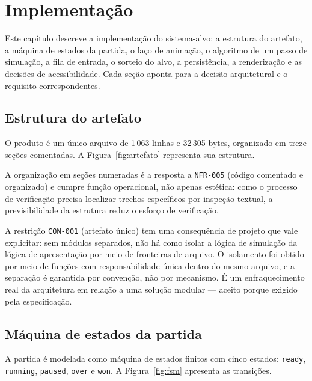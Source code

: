 
\chapter{Implementação}
\label{cap:implementacao}

Este capítulo descreve a implementação do sistema-alvo: a estrutura do artefato,
a máquina de estados da partida, o laço de animação, o algoritmo de um passo de
simulação, a fila de entrada, o sorteio do alvo, a persistência, a renderização e
as decisões de acessibilidade. Cada seção aponta para a decisão arquitetural e o
requisito correspondentes.

\section{Estrutura do artefato}
\label{sec:impl-estrutura}

O produto é um único arquivo de 1\,063 linhas e 32\,305 bytes, organizado em
treze seções comentadas. A Figura~\ref{fig:artefato} representa sua estrutura.



A organização em seções numeradas é a resposta a \texttt{NFR-005} (código
comentado e organizado) e cumpre função operacional, não apenas estética: como o
processo de verificação precisa localizar trechos específicos por inspeção
textual, a previsibilidade da estrutura reduz o esforço de verificação.

A restrição \texttt{CON-001} (artefato único) tem uma consequência de projeto que
vale explicitar: sem módulos separados, não há como isolar a lógica de simulação
da lógica de apresentação por meio de fronteiras de arquivo. O isolamento foi
obtido por meio de funções com responsabilidade única dentro do mesmo arquivo, e
a separação é garantida por convenção, não por mecanismo. É um enfraquecimento
real da arquitetura em relação a uma solução modular --- aceito porque exigido
pela especificação.

\section{Máquina de estados da partida}
\label{sec:impl-fsm}

A partida é modelada como máquina de estados finitos com cinco estados:
\texttt{ready}, \texttt{running}, \texttt{paused}, \texttt{over} e \texttt{won}.
A Figura~\ref{fig:fsm} apresenta as transições.

